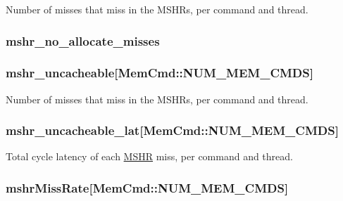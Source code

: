 \label{group__CacheStatistics_gaececf7d3c236db3a8f26999e5330a7f8}
Number of misses that miss in the MSHRs, per command and thread. \hypertarget{group__CacheStatistics_ga031ceb1999386dd8e6f8e9355942d9eb}{
\subsubsection[{mshr\_\-no\_\-allocate\_\-misses}]{ mshr\_\-no\_\-allocate\_\-misses}}
\label{group__CacheStatistics_ga031ceb1999386dd8e6f8e9355942d9eb}
\hypertarget{group__CacheStatistics_gafef11db68765de904faaf296082e02e3}{
\subsubsection[{mshr\_\-uncacheable}]{ mshr\_\-uncacheable\mbox{[}MemCmd::NUM\_\-MEM\_\-CMDS\mbox{]}}}
\label{group__CacheStatistics_gafef11db68765de904faaf296082e02e3}
Number of misses that miss in the MSHRs, per command and thread. \hypertarget{group__CacheStatistics_ga7dd6d70b9cba9493a783a2aceadb23b1}{
\subsubsection[{mshr\_\-uncacheable\_\-lat}]{ mshr\_\-uncacheable\_\-lat\mbox{[}MemCmd::NUM\_\-MEM\_\-CMDS\mbox{]}}}
\label{group__CacheStatistics_ga7dd6d70b9cba9493a783a2aceadb23b1}
Total cycle latency of each \hyperlink{classMSHR}{MSHR} miss, per command and thread. \hypertarget{group__CacheStatistics_ga2e5641462c14394bea8a57328586ab08}{
\subsubsection[{mshrMissRate}]{ mshrMissRate\mbox{[}MemCmd::NUM\_\-MEM\_\-CMDS\mbox{]}}}

